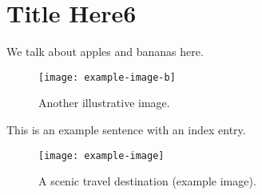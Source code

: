 \newpage
\chapter{Title Here6}


We talk about apples and bananas here.
\begin{figure}[htbp]
  \centering
  \texttt{[image: example-image-b]} 
  \caption{Another illustrative image.}
\end{figure}



This is an example sentence with an index entry.

\begin{figure}[htbp]
  \centering
  \texttt{[image: example-image]} %
  \caption{A scenic travel destination (example image).}
\end{figure}
\lipsum[1]  %




